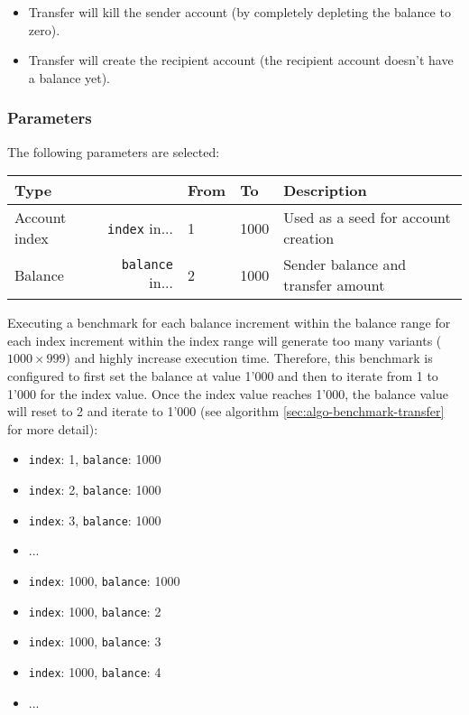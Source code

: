 \documentclass[11pt,a4paper]{article}
\begin{document}
\begin{itemize}
  \item Transfer will kill the sender account (by completely depleting the balance to zero).
  \item Transfer will create the recipient account (the recipient account doesn't have a balance yet).
\end{itemize}

\subsubsection*{Parameters}
The following parameters are selected:

\begin{center}
  \begin{tabular}{ l|r l l l }
    \textbf{Type} && \textbf{From} & \textbf{To} & \textbf{Description}\\
    \hline
    Account index & \verb|index| in... & 1 & 1000 & Used as a seed for account creation \\
    Balance & \verb|balance| in... & 2 & 1000 & Sender balance and transfer amount \\
  \end{tabular}
\end{center}

Executing a benchmark for each balance increment within the balance range for each index increment
within the index range will generate too many variants ($1000 \times 999$) and highly increase
execution time. Therefore, this benchmark is configured to first set the balance at value 1'000
and then to iterate from 1 to 1'000 for the index value. Once the index value reaches 1'000, the
balance value will reset to 2 and iterate to 1'000 (see algorithm \ref{sec:algo-benchmark-transfer}
for more detail):

\begin{itemize}
  \item \verb|index|: 1, \verb|balance|: 1000
  \item \verb|index|: 2, \verb|balance|: 1000
  \item \verb|index|: 3, \verb|balance|: 1000
  \item ...
  \item \verb|index|: 1000, \verb|balance|: 1000
  \item \verb|index|: 1000, \verb|balance|: 2
  \item \verb|index|: 1000, \verb|balance|: 3
  \item \verb|index|: 1000, \verb|balance|: 4
  \item ...
\end{itemize}
\end{document}
